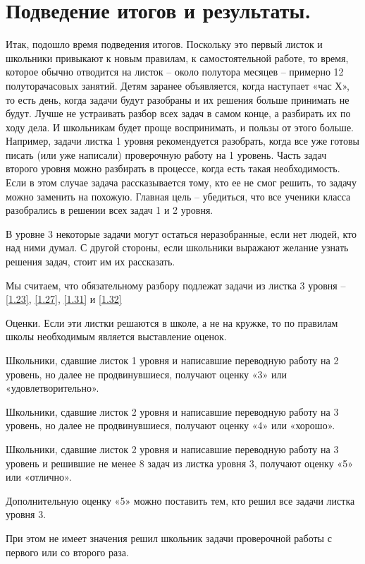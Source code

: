 \section{ Подведение итогов  и результаты.}

 Итак, подошло время подведения итогов. Поскольку это первый листок и школьники привыкают к новым правилам, к самостоятельной работе, то время, которое обычно отводится на листок -- около полутора месяцев -- примерно 12 полуторачасовых занятий. Детям заранее объявляется, когда наступает «час Х», то есть день, когда задачи будут разобраны и их решения больше принимать не будут. Лучше не устраивать разбор всех задач в самом конце, а разбирать их по ходу дела. И школьникам будет проще воспринимать, и пользы от этого больше. Например, задачи листка 1 уровня рекомендуется разобрать, когда все уже готовы писать (или уже написали) проверочную работу на 1 уровень. Часть задач второго уровня можно разбирать в процессе, когда есть такая необходимость. Если в этом случае задача рассказывается тому, кто ее не смог решить, то задачу можно заменить на похожую. Главная цель -- убедиться, что все ученики класса разобрались в решении всех задач 1 и 2 уровня.

 В уровне 3 некоторые задачи могут остаться неразобранные, если нет людей, кто над ними думал. С другой стороны, если школьники выражают желание узнать решения задач, стоит им их рассказать. 

 Мы считаем, что обязательному разбору подлежат задачи из листка 3 уровня -- \ref{1.23}, \ref{1.27}, \ref{1.31} и \ref{1.32}

 Оценки. Если эти листки решаются в школе, а не на кружке, то по правилам школы необходимым является выставление оценок. 

 Школьники, сдавшие листок 1 уровня и написавшие переводную работу на 2 уровень, но далее не продвинувшиеся, получают оценку «3» или «удовлетворительно».

 Школьники, сдавшие листок 2 уровня и написавшие переводную работу на 3 уровень, но далее не продвинувшиеся, получают оценку «4» или «хорошо».

 Школьники, сдавшие листок 2 уровня и написавшие переводную работу на 3 уровень и решившие не менее 8 задач из листка уровня 3, получают оценку «5» или «отлично». 

 Дополнительную оценку «5» можно поставить тем, кто решил все задачи листка уровня 3.

 При этом не имеет значения решил школьник задачи проверочной работы с первого или со второго раза.


